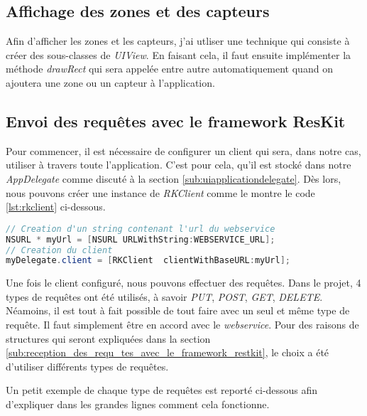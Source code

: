 \subsection{Affichage des zones et des capteurs} %
\label{sub:affichage_des_zones_et_des_capteurs}

Afin d'afficher les zones et les capteurs, j'ai utliser une technique qui consiste à créer des sous-classes de \emph{UIView}. En faisant cela, il faut ensuite implémenter la méthode \emph{drawRect} qui sera appelée entre autre automatiquement quand on ajoutera une zone ou un capteur à l'application.

\subsection{Envoi des requêtes avec le framework ResKit} %
\label{sub:envoi_des_requ_tes_via_reskit}
Pour commencer, il est nécessaire de configurer un client qui sera, dans notre cas, utiliser à travers toute l'application. C'est pour cela, qu'il est stocké dans notre \emph{AppDelegate} comme discuté à la section \ref{sub:uiapplicationdelegate}. Dès lors, nous pouvons créer une instance de \emph{RKClient} comme le montre le code \ref{lst:rkclient} ci-dessous.

\begin{lstlisting}[language={JAVA}, caption={Création d'une instance de RKClient}, label={lst:rkclient}]
// Creation d'un string contenant l'url du webservice
NSURL * myUrl = [NSURL URLWithString:WEBSERVICE_URL];
// Creation du client
myDelegate.client = [RKClient  clientWithBaseURL:myUrl];
\end{lstlisting}

Une fois le client configuré, nous pouvons effectuer des requêtes. Dans le projet, 4 types de requêtes ont été utilisés, à savoir \emph{PUT}, \emph{POST}, \emph{GET}, \emph{DELETE}. Néamoins, il est tout à fait possible de tout faire avec un seul et même type de requête. Il faut simplement être en accord avec le \emph{\gls{webservice}}. Pour des raisons de structures qui seront expliquées dans la section \ref{sub:reception_des_requ_tes_avec_le_framework_restkit}, le choix a été d'utiliser différents types de requêtes.

\medskip

Un petit exemple de chaque type de requêtes est reporté ci-dessous afin d'expliquer dans les grandes lignes comment cela fonctionne.

\medskip

